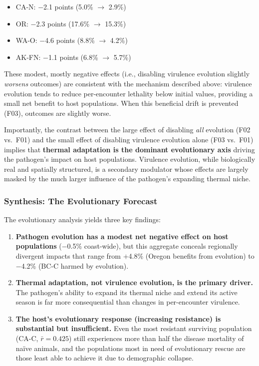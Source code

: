 \begin{itemize}
  \item CA-N: $-$2.1 points (5.0\% $\rightarrow$ 2.9\%)
  \item OR: $-$2.3 points (17.6\% $\rightarrow$ 15.3\%)
  \item WA-O: $-$4.6 points (8.8\% $\rightarrow$ 4.2\%)
  \item AK-FN: $-$1.1 points (6.8\% $\rightarrow$ 5.7\%)
\end{itemize}

\noindent
These modest, mostly negative effects (i.e., disabling virulence
evolution slightly \textit{worsens} outcomes) are consistent with the
mechanism described above: virulence evolution tends to reduce
per-encounter lethality below initial values, providing a small net
benefit to host populations.  When this beneficial drift is prevented
(F03), outcomes are slightly worse.

Importantly, the contrast between the large effect of disabling
\textit{all} evolution (F02 vs.\ F01) and the small effect of
disabling virulence evolution alone (F03 vs.\ F01) implies that
\textbf{thermal adaptation is the dominant evolutionary axis} driving
the pathogen's impact on host populations.  Virulence evolution, while
biologically real and spatially structured, is a secondary modulator
whose effects are largely masked by the much larger influence of the
pathogen's expanding thermal niche.

\subsubsection{Synthesis: The Evolutionary Forecast}

The evolutionary analysis yields three key findings:

\begin{enumerate}
  \item \textbf{Pathogen evolution has a modest net negative effect
    on host populations} ($-$0.5\% coast-wide), but this aggregate
    conceals regionally divergent impacts that range from $+$4.8\% 
    (Oregon benefits from evolution) to $-$4.2\% (BC-C harmed by 
    evolution).
  \item \textbf{Thermal adaptation, not virulence evolution, is the
    primary driver.}  The pathogen's ability to expand its thermal
    niche and extend its active season is far more consequential than
    changes in per-encounter virulence.
  \item \textbf{The host's evolutionary response (increasing
    resistance) is substantial but insufficient.}  Even the most
    resistant surviving population (CA-C, $\bar{r} = 0.425$) still
    experiences more than half the disease mortality of na\"ive
    animals, and the populations most in need of evolutionary rescue
    are those least able to achieve it due to demographic collapse.
\end{enumerate}

